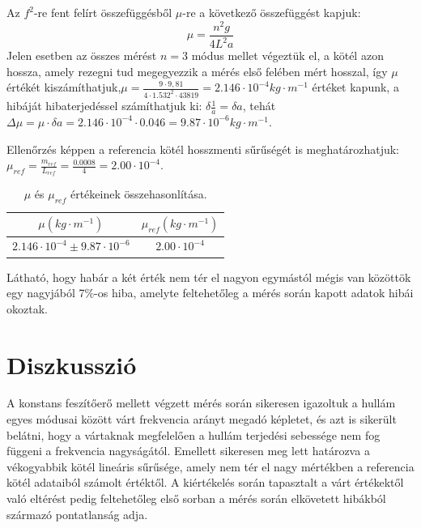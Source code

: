 \documentclass[10pt,pdftex]{report}
\begin{document}
Az $f^2$-re fent felírt összefüggésből $\mu$-re a következő összefüggést kapjuk:
\begin{equation*}
    \mu=\frac{n^2g}{4L^2a}
\end{equation*}
Jelen esetben az összes mérést $n=3$ módus mellet végeztük el, a kötél azon hossza, amely rezegni tud megegyezzik a mérés első felében mért hosszal, így $\mu$ értékét kiszámíthatjuk,\newline $\mu=\frac{9\cdot 9,81}{4\cdot 1.532^2\cdot 43819}=2.146\cdot 10^{-4}kg\cdot m^{-1}$ értéket kapunk, a hibáját hibaterjedéssel számíthatjuk ki: $\delta \frac{1}{a}=\delta a$, tehát $\Delta \mu=\mu\cdot\delta a=2.146\cdot 10^{-4}\cdot0.046=9.87\cdot10^{-6}kg\cdot m^{-1}$.\newline 


Ellenőrzés képpen a referencia kötél hosszmenti sűrűségét is meghatározhatjuk: $\mu_{ref}=\frac{m_{ref}}{L_{ref}}=\frac{0.0008}{4}=2.00\cdot10^{-4}$.
\begin{table}[H]
    \centering
    \begin{tabular}{|c|c|}
        \hline
        $\mu(kg\cdot m^{-1})$ & $\mu_{ref}(kg\cdot m^{-1})$ \\
        \hline
        $2.146\cdot10^{-4}\pm9.87\cdot10^{-6}$ & $2.00\cdot10^{-4}$ \\
        \hline
    \end{tabular}
    \caption{$\mu$ és $\mu_{ref}$ értékeinek összehasonlítása.}
\end{table}
Látható, hogy habár a két érték nem tér el nagyon egymástól mégis van közöttök egy nagyjából 7\%-os hiba, amelyte feltehetőleg a mérés során kapott adatok hibái okoztak.
\section*{Diszkusszió}
A konstans feszítőerő mellett végzett mérés során sikeresen igazoltuk a hullám egyes módusai között várt frekvencia arányt megadó képletet, és azt is sikerült belátni, hogy a vártaknak megfelelően a hullám terjedési sebessége nem fog függeni a frekvencia nagyságától. Emellett sikeresen meg lett határozva a vékogyabbik kötél lineáris sűrűsége, amely nem tér el nagy mértékben a referencia kötél adataiból számolt értéktől. A kiértékelés során tapasztalt a várt értékektől való eltérést pedig feltehetőleg első sorban a mérés során elkövetett hibákból származó pontatlanság adja.
\end{document}
